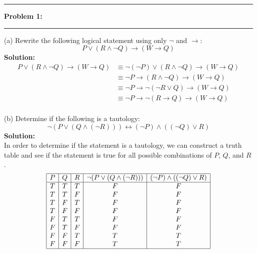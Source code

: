 \documentclass[11pt]{article}
\newcommand\question[2]{\vspace{.25in}\hrule\textbf{#1: #2}\vspace{.5em}\hrule\vspace{.10in}}
\begin{document}
\raggedright
\newcommand\NAME{Carl Kingsford}  %
\newcommand\ANDREWID{ckingsf}     %
\newcommand\HWNUM{1}              %

\newcommand{\sumn}{\sum_{n=0}^{\infty}}
\newcommand{\ea}{e^{\alpha}}
\newcommand{\nea}{e^{-\alpha}}
\newcommand{\solution}{\textbf{Solution: }\\}
\newcommand{\set}[1]{\{#1\}}
\newcommand{\N}{\mathbb{N}}
\newcommand{\Z}{\mathbb{Z}}
\newcommand{\R}{\mathbb{R}}

\question{Problem 1}{}
(a) Rewrite the following logical statement using only $\lnot$ and $\to$:
\[P \lor (R\land \lnot Q) \to (W \to Q)\]
\solution
\begin{align*}
    P \lor (R\land \lnot Q) \to (W \to Q) &\equiv \lnot(\lnot P) \lor (R\land \lnot Q) \to (W \to Q)\\
                                          &\equiv \lnot P \to (R \land \lnot Q) \to (W \to Q)\\
                                          &\equiv \lnot P \to \lnot(\lnot R \lor Q) \to (W \to Q)\\
                                          &\equiv \lnot P \to \lnot(R\to Q) \to (W \to Q)\\
\end{align*}

(b) Determine if the following is a tautology:
\[\lnot (P\lor (Q\land (\lnot R)))\longleftrightarrow (\lnot P) \land ((\lnot Q)\lor R)\]
\solution

In order to determine if the statement is a tautology, we can construct a truth table and see if the statement is true for all possible combinations of $P$, $Q$, and $R$.
\[
\begin{array}{|c|c|c|c|c|c|c|c|c|c|c|}
\hline
P & Q & R & \lnot (P \lor (Q \land (\lnot R))) & (\lnot P) \land ((\lnot Q) \lor R) \\
\hline
T & T & T & F & F \\
T & T & F & F & F \\
T & F & T & F & F \\
T & F & F & F & F \\
F & T & T & F & F \\
F & T & F & F & F \\
F & F & T & T & T \\
F & F & F & T & T \\
\hline
\end{array}
\]
\end{document}
